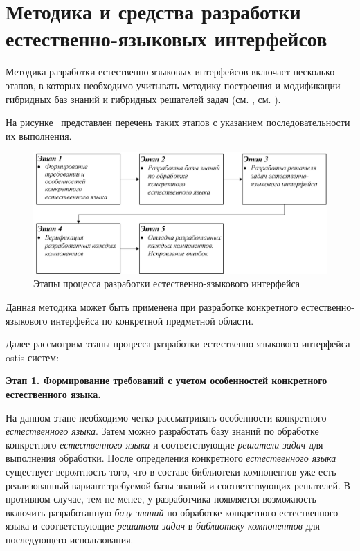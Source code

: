 \section{Методика и средства разработки естественно-языковых интерфейсов}
\label{section_natural_language_interface_development_methods}

Методика разработки естественно-языковых интерфейсов включает несколько этапов, в которых необходимо учитывать методику построения и модификации гибридных баз знаний и гибридных решателей задач (см. , см. ).

\newpage

На рисунке~\textit{} представлен перечень таких этапов с указанием последовательности их выполнения.

\begin{figure}[H]
	\centering
	\includegraphics[scale=0.8,width=1.0\textwidth]{images/part4/chapter_chinese/method}
	\caption{Этапы процесса разработки естественно-языкового интерфейса}
	\label{fig:method-interface}
\end{figure}

Данная методика может быть применена при разработке конкретного естественно-языкового интерфейса по конкретной предметной области.

Далее рассмотрим этапы процесса разработки естественно-языкового интерфейса ostis-систем:

\textbf{Этап 1. Формирование требований с учетом особенностей конкретного естественного языка.}

На данном этапе необходимо четко рассматривать особенности конкретного \textit{естественного языка}.
Затем можно разработать базу знаний по обработке конкретного \textit{естественного языка} и соответствующие \textit{решатели задач} для выполнения обработки.
После определения конкретного \textit{естественного языка} существует вероятность того, что в составе библиотеки компонентов уже есть реализованный вариант требуемой базы знаний и соответствующих решателей.
В противном случае, тем не менее, у разработчика появляется возможность включить разработанную \textit{базу знаний} по обработке конкретного естественного языка и соответствующие \textit{решатели задач} в \textit{библиотеку компонентов} для последующего использования.

